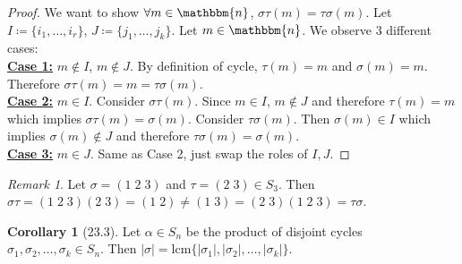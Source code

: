\documentclass{article}
\newcommand{\coleq}{\coloneqq}
\newcommand{\define}[1]{\textbf{\underline{#1}}}
\theoremstyle{definition}
\newtheorem*{cor}{Corollary}
\theoremstyle{remark}
\newtheorem*{rmk}{Remark}
\begin{document}
{{            \begin{proof}
                We want to show $\forall m \in \mathbbm{n}$, $\sigma\tau(m)=\tau\sigma(m)$. Let $I\coleq\{i_1,\ldots,i_r\}$, $J\coleq\{j_1,\ldots,j_k\}$. Let $m\in \mathbbm{n}$. We observe 3 different cases:\\
                \define{Case 1:} $m \notin I$, $m\notin J$. By definition of cycle, $\tau(m)=m$ and $\sigma(m)=m$. Therefore $\sigma\tau(m)=m=\tau\sigma(m)$.\\
                \define{Case 2:} $m\in I$. Consider $\sigma\tau(m)$. Since $m\in I$, $m\notin J$ and therefore $\tau(m)=m$ which implies $\sigma\tau(m)=\sigma(m)$. Consider $\tau\sigma(m)$. Then $\sigma(m)\in I$ which implies $\sigma(m)\notin J$ and therefore $\tau\sigma(m)=\sigma(m)$.\\
                \define{Case 3:} $m\in J$. Same as Case 2, just swap the roles of $I,J$.
            \end{proof}
            
            \begin{rmk}
                Let $\sigma=(1\;2\;3)$ and $\tau=(2\;3)\in S_3$. Then $\sigma\tau=(1\;2\;3)(2\;3)=(1\;2)\neq(1\;3)=(2\;3)(1\;2\;3)=\tau\sigma$.
            \end{rmk}
            
            \begin{cor}[23.3]
                Let $\alpha \in S_n$ be the product of disjoint cycles $\sigma_1,\sigma_2,\ldots,\sigma_k\in S_n$. Then $|\sigma|=\mathrm{lcm}\{|\sigma_1|,|\sigma_2|,\ldots,|\sigma_k|\}$.
            \end{cor}
        }
    }
\end{document}
